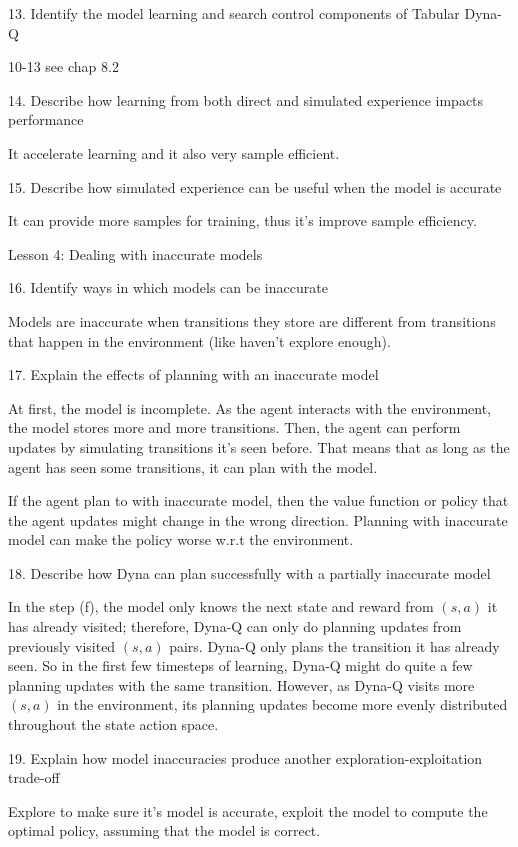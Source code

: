 \documentclass[sutton_barto_notes.tex]{subfiles}
\begin{document}
13. Identify the model learning and search control components of Tabular Dyna-Q 

10-13 see chap 8.2

14. Describe how learning from both direct and simulated experience impacts performance 

It accelerate learning and it also very sample efficient.

15. Describe how simulated experience can be useful when the model is accurate 

It can provide more samples for training, thus it's improve sample efficiency.

Lesson 4: Dealing with inaccurate models 

16. Identify ways in which models can be inaccurate 

Models are inaccurate when transitions they store are different from transitions that happen in the environment (like haven't explore enough).

17. Explain the effects of planning with an inaccurate model 

At first, the model is incomplete. As the agent interacts with the environment, the model stores more and more transitions. Then, the agent can perform updates by simulating transitions it's seen before. That means that as long as the agent has seen some transitions, it can plan with the model.

If the agent plan to with inaccurate model, then the value function or policy that the agent updates might change in the wrong direction. Planning with inaccurate model can make the policy worse w.r.t the environment.

18. Describe how Dyna can plan successfully with a partially inaccurate model 

In the step (f), the model only knows the next state and reward from $(s,a)$ it has already visited; therefore, Dyna-Q can only do planning updates from previously visited $(s,a)$ pairs. Dyna-Q only plans the transition it has already seen. So in the first few timesteps of learning, Dyna-Q might do quite a few planning updates with the same transition. However, as Dyna-Q visits more $(s,a)$ in the environment, its planning updates become more evenly distributed throughout the state action space.

19. Explain how model inaccuracies produce another exploration-exploitation trade-off 

Explore to make sure it's model is accurate, exploit the model to compute the optimal policy, assuming that the model is correct.
\end{document}
